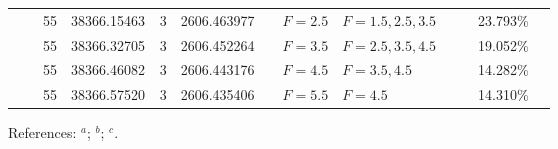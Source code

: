 \begin{table*}
\begin{center}
{\begin{tabular}{:l;l;c;l;c;l;c;l;l;c;c;c;c}
\rowstyle{\itshape}               &        & 55        & 38366.15463$^{}$                 & 3 &   2606.463977      &      & $F=2.5                                   $ & $F=1.5,2.5,3.5                           $ & $      $ &              & 23.793\%  & $          $\\
\rowstyle{\itshape}               &        & 55        & 38366.32705$^{}$                 & 3 &   2606.452264      &      & $F=3.5                                   $ & $F=2.5,3.5,4.5                           $ & $      $ &              & 19.052\%  & $          $\\
\rowstyle{\itshape}               &        & 55        & 38366.46082$^{}$                 & 3 &   2606.443176      &      & $F=4.5                                   $ & $F=3.5,4.5                               $ & $      $ &              & 14.282\%  & $          $\\
\rowstyle{\itshape}               &        & 55        & 38366.57520$^{}$                 & 3 &   2606.435406      &      & $F=5.5                                   $ & $F=4.5                                   $ & $      $ &              & 14.310\%  & $          $\\
\hline
\end{tabular}
}
{\footnotesize References:
$^{a}$\citet{Aldenius:2009:014008};
$^{b}$\citet{Blackwell-Whitehead:2005:705};
$^{c}$\citet{Nave:2012:1570}.}
\end{center}
\end{table*}
